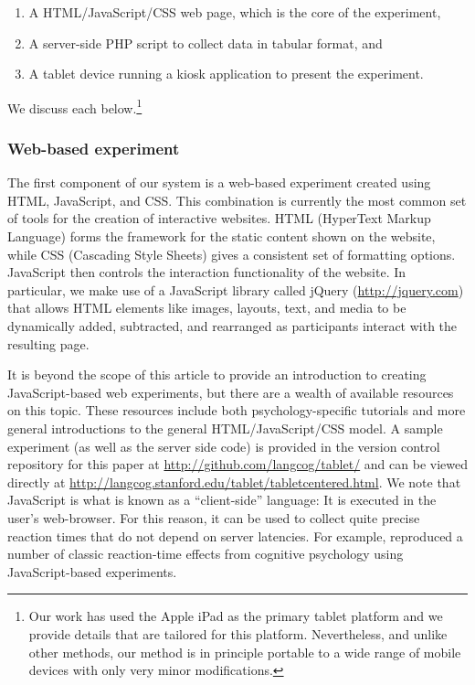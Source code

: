 \documentclass[man,noapacite]{apa2}
\begin{document}
\begin{enumerate}
\item A HTML/JavaScript/CSS web page, which is the core of the experiment, 
\item A server-side PHP script to collect data in tabular format, and
\item A tablet device running a kiosk application to present the experiment. 
\end{enumerate}

\noindent We discuss each below.\footnote{Our work has used the Apple iPad as the primary tablet platform and we provide details that are tailored for this platform. Nevertheless, and unlike other methods, our method is in principle portable to a wide range of mobile devices with only very minor modifications.}

\subsubsection{Web-based experiment}

The first component of our system is a web-based experiment created using HTML, JavaScript, and CSS. This combination is currently the most common set of tools for the creation of interactive websites. HTML (HyperText Markup Language) forms the framework for the static content shown on the website, while CSS (Cascading Style Sheets) gives a consistent set of formatting options. JavaScript then controls the interaction functionality of the website. In particular, we make use of a JavaScript library called jQuery (\url{http://jquery.com}) that allows HTML elements like images, layouts, text, and media to be dynamically added, subtracted, and rearranged as participants interact with the resulting page. 

It is beyond the scope of this article to provide an introduction to creating JavaScript-based web experiments, but there are a wealth of available resources on this topic. These resources include both psychology-specific tutorials and more general introductions to the general HTML/JavaScript/CSS model. A sample experiment (as well as the server side code) is provided in the version control repository for this paper  at \url{http://github.com/langcog/tablet/} and can be viewed directly at \url{http://langcog.stanford.edu/tablet/tabletcentered.html}. We note that JavaScript is what is known as a ``client-side'' language: It is executed in the user's web-browser. For this reason, it can be used to collect quite precise reaction times that do not depend on server latencies. For example,  reproduced a number of classic reaction-time effects from cognitive psychology using JavaScript-based experiments. 
\end{document}
